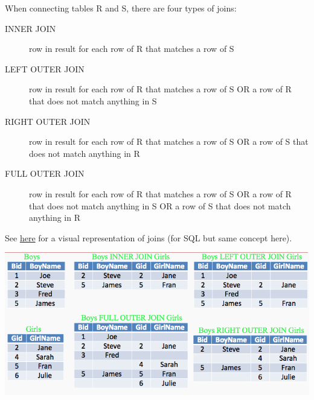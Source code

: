 \documentclass[xcolor=svgnames]{beamer} %
\begin{document}
\begin{frame}
 When connecting tables  R and  S, there are four types of joins:
\begin{description}
\item [INNER JOIN] row in result for each row of R that matches a row of S
\item [LEFT OUTER JOIN] row in result for each row of R that matches a row of S OR a row of R that does not match anything in S
\item [RIGHT OUTER JOIN] row in result for each row of R that matches a row of S OR a row of S that does not match anything in R
\item [FULL OUTER JOIN] row in result for each row of R that matches a row of S OR a row of R that does not match anything in S OR a row of S that does not match anything in R
\end{description}
See \href{https://www.codeproject.com/Articles/33052/Visual-Representation-of-SQL-Joins}{here} for a visual representation of joins (for SQL but same concept here).
\end{frame}

\begin{frame}
\includegraphics[width=1.\textwidth]{img/joins}
\end{frame}

%
%
%
\end{document}
